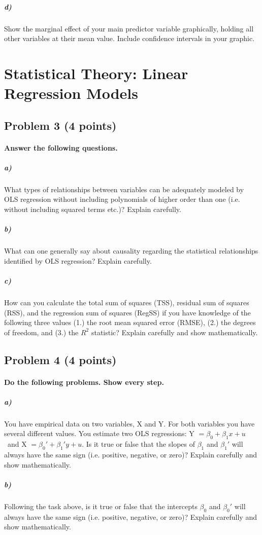 \documentclass[12pt]{article}
\begin{document}
\subparagraph{d)} Show the marginal effect of your main predictor variable graphically, holding all other variables at their mean value. Include confidence intervals in your graphic.



\section*{Statistical Theory: Linear Regression Models}

\subsection*{Problem 3 (4 points)}

\paragraph{Answer the following questions.}

\subparagraph{a)} What types of relationships between variables can be adequately modeled by OLS regression without including polynomials of higher order than one (i.e. without including squared terms etc.)? Explain carefully.

\subparagraph{b)} What can one generally say about causality regarding the statistical relationships identified by OLS regression? Explain carefully.

\subparagraph{c)} How can you calculate the total sum of squares (TSS), residual sum of squares (RSS), and the regression sum of squares (RegSS) if you have knowledge of the following three values (1.) the root mean squared error (RMSE), (2.) the degrees of freedom, and (3.) the $R^2$ statistic? Explain carefully and show mathematically.



\subsection*{Problem 4 (4 points)}

\paragraph{Do the following problems. Show every step.}

\subparagraph{a)} You have empirical data on two variables, X and Y. For both variables you have several different values. You estimate two OLS regressions: Y $= \beta_0 + \beta_1 x + u$ \ and X $= \beta_0' + \beta_1' y + u$. Is it true or false that the slopes of $\beta_1$ and $\beta_1'$ will always have the same sign (i.e. positive, negative, or zero)? Explain carefully and show mathematically.

\subparagraph{b)} Following the task above, is it true or false that the intercepts $\beta_0$ and $\beta_0'$ will always have the same sign (i.e. positive, negative, or zero)? Explain carefully and show mathematically.
\end{document}
